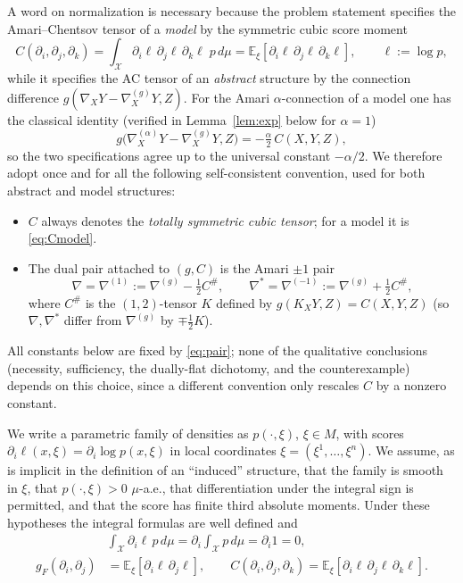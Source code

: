 \documentclass{amsart}
\theoremstyle{definition}
\theoremstyle{remark}
\begin{document}
A word on normalization is necessary because the problem statement specifies the
Amari--Chentsov tensor of a \emph{model} by the symmetric cubic score moment
\begin{equation}\label{eq:Cmodel}
  C(\partial_{i},\partial_{j},\partial_{k})
  =\int_{\mathcal X}\partial_{i}\ell\,\partial_{j}\ell\,\partial_{k}\ell\;p\,d\mu
  =\mathbb E_{\xi}[\partial_{i}\ell\,\partial_{j}\ell\,\partial_{k}\ell],
  \qquad \ell:=\log p,
\end{equation}
while it specifies the AC tensor of an \emph{abstract} structure by the
connection difference $g(\nabla_{X}Y-\nabla^{(g)}_{X}Y,Z)$. For the Amari
$\alpha$-connection of a model one has the classical identity (verified in
Lemma~\ref{lem:exp} below for $\alpha=1$)
\begin{equation}\label{eq:normaliz}
  g\bigl(\nabla^{(\alpha)}_{X}Y-\nabla^{(g)}_{X}Y,Z\bigr)
   =-\tfrac{\alpha}{2}\,C(X,Y,Z),
\end{equation}
so the two specifications agree up to the universal constant $-\alpha/2$. We
therefore adopt once and for all the following self-consistent convention, used
for both abstract and model structures:
\begin{itemize}
\item $C$ always denotes the \emph{totally symmetric cubic tensor}; for a model
it is \eqref{eq:Cmodel}.
\item The dual pair attached to $(g,C)$ is the Amari $\pm1$ pair
\begin{equation}\label{eq:pair}
  \nabla=\nabla^{(1)}:=\nabla^{(g)}-\tfrac12 C^{\#},\qquad
  \nabla^{*}=\nabla^{(-1)}:=\nabla^{(g)}+\tfrac12 C^{\#},
\end{equation}
where $C^{\#}$ is the $(1,2)$-tensor $K$ defined by
$g(K_{X}Y,Z)=C(X,Y,Z)$ (so $\nabla,\nabla^{*}$ differ from $\nabla^{(g)}$ by
$\mp\tfrac12 K$).
\end{itemize}
All constants below are fixed by \eqref{eq:pair}; none of the qualitative
conclusions (necessity, sufficiency, the dually-flat dichotomy, and the
counterexample) depends on this choice, since a different convention only
rescales $C$ by a nonzero constant.

We write a parametric family of densities as $p(\cdot,\xi)$, $\xi\in M$, with
scores $\partial_{i}\ell(x,\xi)=\partial_{i}\log p(x,\xi)$ in local coordinates
$\xi=(\xi^{1},\dots,\xi^{n})$. We assume, as is implicit in the definition of an
``induced'' structure, that the family is smooth in $\xi$, that
$p(\cdot,\xi)>0$ $\mu$-a.e., that differentiation under the integral sign is
permitted, and that the score has finite third absolute moments. Under these
hypotheses the integral formulas are well defined and
\begin{align}
  &\int_{\mathcal X}\partial_{i}\ell\,p\,d\mu
     =\partial_{i}\!\int_{\mathcal X}p\,d\mu=\partial_{i}1=0,\label{eq:scoremean}\\
  g_{F}(\partial_{i},\partial_{j})&=\mathbb E_{\xi}[\partial_{i}\ell\,
     \partial_{j}\ell],\qquad
  C(\partial_{i},\partial_{j},\partial_{k})
     =\mathbb E_{\xi}[\partial_{i}\ell\,\partial_{j}\ell\,\partial_{k}\ell].
     \label{eq:gC}
\end{align}
\end{document}

